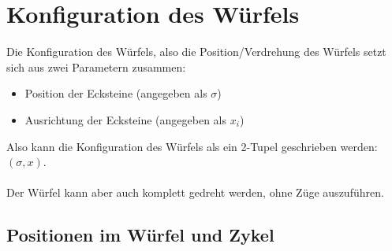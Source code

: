 \documentclass[12pt,a4paper, usenames, dvipsnames]{scrartcl}
\begin{document}
\section{Konfiguration des Würfels}
Die Konfiguration des Würfels, also die Position/Verdrehung des Würfels setzt sich aus zwei Parametern zusammen: \\
\begin{itemize}
\item Position der Ecksteine (angegeben als $\sigma$)
\item Ausrichtung der Ecksteine (angegeben als $x_i$)
\end{itemize}
Also kann die Konfiguration des Würfels als ein 2-Tupel geschrieben werden: $(\sigma, x)$. \\
\\
Der Würfel kann aber auch komplett gedreht werden, ohne Züge auszuführen.



















\subsection*{Positionen im Würfel und Zykel}
\end{document}
